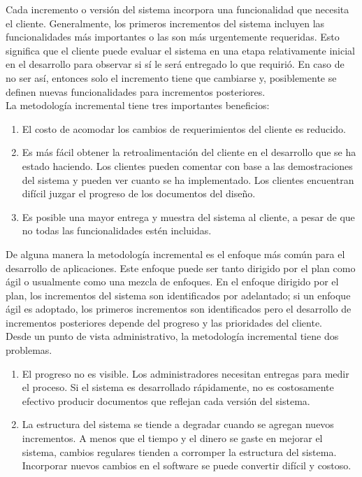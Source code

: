 \documentclass[12pt]{report}
\begin{document}
Cada incremento o versión del sistema incorpora una funcionalidad que necesita el cliente. Generalmente, los primeros incrementos del sistema incluyen las funcionalidades más importantes o las son más urgentemente requeridas. Esto significa que el cliente puede evaluar el sistema en una etapa relativamente inicial en el desarrollo para observar si sí le será entregado lo que requirió. En caso de no ser así, entonces solo el incremento tiene que cambiarse y, posiblemente se definen nuevas funcionalidades para incrementos posteriores.\\

La metodología incremental tiene tres importantes beneficios:
\begin{enumerate}
\item El costo de acomodar los cambios de requerimientos del cliente es reducido.
\item  Es más fácil obtener la retroalimentación del cliente en el desarrollo que se ha estado haciendo. Los clientes pueden comentar con base a las demostraciones del sistema y pueden ver cuanto se ha implementado. Los clientes encuentran difícil juzgar el progreso de los documentos del diseño.
\item Es posible una mayor entrega y muestra del sistema al cliente, a pesar de que no todas las funcionalidades estén incluidas.
\end{enumerate}

De alguna manera la metodología incremental es el enfoque más común para el desarrollo de aplicaciones. Este enfoque puede ser tanto dirigido por el plan como ágil o usualmente como una mezcla de enfoques. En el enfoque dirigido por el plan, los incrementos del sistema son identificados por adelantado; si un enfoque ágil es adoptado, los primeros incrementos son identificados pero el desarrollo de incrementos posteriores depende del progreso y las prioridades del cliente.\cite{meto}\\

Desde un punto de vista administrativo, la metodología incremental tiene dos problemas.

\begin{enumerate}
\item El progreso no es visible. Los administradores necesitan entregas para medir el proceso. Si el sistema es desarrollado rápidamente, no es costosamente efectivo producir documentos que reflejan cada versión del sistema.
\item La estructura del sistema se tiende a degradar cuando se agregan nuevos incrementos. A menos que el tiempo y el dinero se gaste en mejorar el sistema, cambios regulares tienden a corromper la estructura del sistema. Incorporar nuevos cambios en el software se puede convertir difícil y costoso. \end{enumerate}
\end{document}
